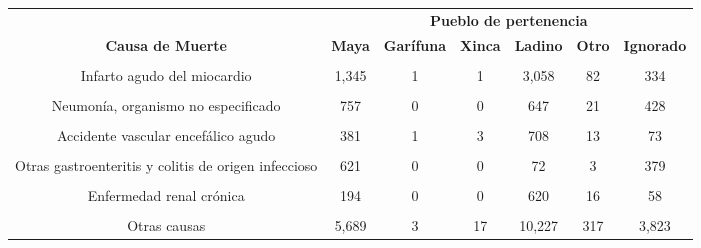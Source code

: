 \begin{tabular}[t]{ccccccc}
\toprule
\multicolumn{1}{c}{\textbf{ }} & \multicolumn{6}{c}{\textbf{Pueblo de pertenencia}} \\
\cmidrule(l{3pt}r{3pt}){2-7}
\textbf{Causa de Muerte} & \textbf{Maya} & \textbf{Garífuna} & \textbf{Xinca} & \textbf{Ladino} & \textbf{Otro} & \textbf{Ignorado}\\
\midrule
\cellcolor[HTML]{B6B3FF}{SARS-CoV2/COVID-19} & \cellcolor[HTML]{B6B3FF}{1,048} & \cellcolor[HTML]{B6B3FF}{4} & \cellcolor[HTML]{B6B3FF}{4} & \cellcolor[HTML]{B6B3FF}{4,107} & \cellcolor[HTML]{B6B3FF}{91} & \cellcolor[HTML]{B6B3FF}{352}\\
Infarto agudo del miocardio & 1,345 & 1 & 1 & 3,058 & 82 & 334\\
\cellcolor[HTML]{B6B3FF}{Diabetes mellitus, no especificada} & \cellcolor[HTML]{B6B3FF}{1,494} & \cellcolor[HTML]{B6B3FF}{2} & \cellcolor[HTML]{B6B3FF}{7} & \cellcolor[HTML]{B6B3FF}{2,785} & \cellcolor[HTML]{B6B3FF}{51} & \cellcolor[HTML]{B6B3FF}{232}\\
Neumonía, organismo no especificado & 757 & 0 & 0 & 647 & 21 & 428\\
\cellcolor[HTML]{B6B3FF}{Diabetes mellitus no insulinodependiente} & \cellcolor[HTML]{B6B3FF}{666} & \cellcolor[HTML]{B6B3FF}{1} & \cellcolor[HTML]{B6B3FF}{1} & \cellcolor[HTML]{B6B3FF}{1,051} & \cellcolor[HTML]{B6B3FF}{22} & \cellcolor[HTML]{B6B3FF}{90}\\
Accidente vascular encefálico agudo & 381 & 1 & 3 & 708 & 13 & 73\\
\cellcolor[HTML]{B6B3FF}{Fibrosis y cirrosis del hígado} & \cellcolor[HTML]{B6B3FF}{396} & \cellcolor[HTML]{B6B3FF}{0} & \cellcolor[HTML]{B6B3FF}{2} & \cellcolor[HTML]{B6B3FF}{617} & \cellcolor[HTML]{B6B3FF}{16} & \cellcolor[HTML]{B6B3FF}{57}\\
Otras gastroenteritis y colitis de origen infeccioso & 621 & 0 & 0 & 72 & 3 & 379\\
\cellcolor[HTML]{B6B3FF}{Tumor maligno del hígado y de las vías biliares intrahepáticas} & \cellcolor[HTML]{B6B3FF}{266} & \cellcolor[HTML]{B6B3FF}{0} & \cellcolor[HTML]{B6B3FF}{3} & \cellcolor[HTML]{B6B3FF}{576} & \cellcolor[HTML]{B6B3FF}{12} & \cellcolor[HTML]{B6B3FF}{51}\\
Enfermedad renal crónica & 194 & 0 & 0 & 620 & 16 & 58\\
\cellcolor[HTML]{B6B3FF}{Síntomas, signos y hallazgos anormales clínicos y de laboratorio} & \cellcolor[HTML]{B6B3FF}{2,862} & \cellcolor[HTML]{B6B3FF}{2} & \cellcolor[HTML]{B6B3FF}{7} & \cellcolor[HTML]{B6B3FF}{3,742} & \cellcolor[HTML]{B6B3FF}{116} & \cellcolor[HTML]{B6B3FF}{889}\\
Otras causas & 5,689 & 3 & 17 & 10,227 & 317 & 3,823\\
\bottomrule
\end{tabular}
